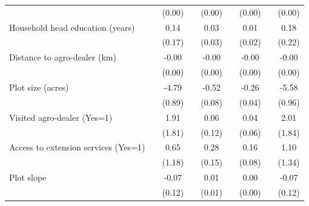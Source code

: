 {\begin{tabular}{l*{8}{c}}
                &                  &   (0.00)         &                  &   (0.00)         &                  &   (0.00)         &                  &   (0.00)         \\
Household head education (years)&                  &     0.14         &                  &     0.03         &                  &     0.01         &                  &     0.18         \\
                &                  &   (0.17)         &                  &   (0.03)         &                  &   (0.02)         &                  &   (0.22)         \\
Distance to agro-dealer (km)&                  &    -0.00         &                  &    -0.00         &                  &    -0.00         &                  &    -0.00         \\
                &                  &   (0.00)         &                  &   (0.00)         &                  &   (0.00)         &                  &   (0.00)         \\
Plot size (acres)&                  &    -4.79\sym{***}&                  &    -0.52\sym{***}&                  &    -0.26\sym{***}&                  &    -5.58\sym{***}\\
                &                  &   (0.89)         &                  &   (0.08)         &                  &   (0.04)         &                  &   (0.96)         \\
Visited agro-dealer (Yes=1)&                  &     1.91         &                  &     0.06         &                  &     0.04         &                  &     2.01         \\
                &                  &   (1.81)         &                  &   (0.12)         &                  &   (0.06)         &                  &   (1.84)         \\
Access to extension services (Yes=1)&                  &     0.65         &                  &     0.28\sym{*}  &                  &     0.16\sym{*}  &                  &     1.10         \\
                &                  &   (1.18)         &                  &   (0.15)         &                  &   (0.08)         &                  &   (1.34)         \\
Plot slope      &                  &    -0.07         &                  &     0.01         &                  &     0.00         &                  &    -0.07         \\
                &                  &   (0.12)         &                  &   (0.01)         &                  &   (0.00)         &                  &   (0.12)         \\

\end{tabular}}
